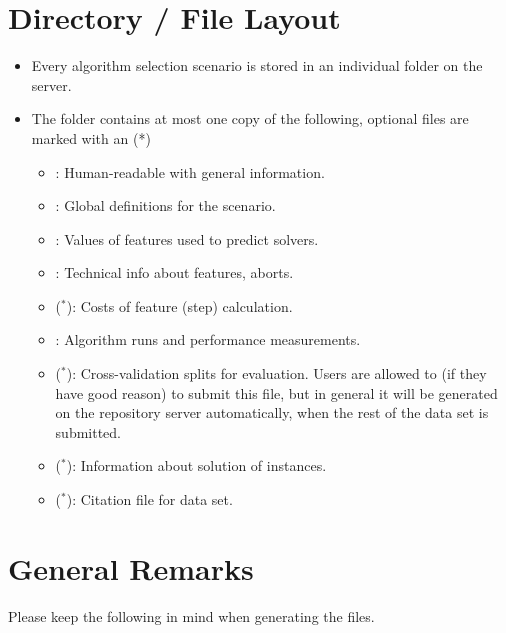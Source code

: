 \documentclass[]{elsarticle}
\begin{document}
\section{Directory / File Layout} 
\begin{itemize}
	\item Every algorithm selection scenario is stored in an individual folder on the server.
	\item The folder contains at most one copy of the following, optional files are marked with an (*)
  	\begin{itemize}
  		\item {}: Human-readable with general information. 
  		\item {}: Global definitions for the scenario. 
  		\item {}: Values of features used to predict solvers. 
  		\item {}: Technical info about features, \eg{} aborts. 
  		\item {} ($^*$): Costs of feature (step) calculation.
  		\item {}: Algorithm runs and performance measurements.
  		\item {} ($^*$): Cross-validation splits for evaluation. Users are allowed
                  to (if they have good reason) to submit this file, but in general it will be generated
                  on the repository server automatically, when the rest of the data set is submitted.
		\item {} ($^*$): Information about solution of instances. 
		\item {} ($^*$): Citation file for data set. 
  	\end{itemize}
\end{itemize}


\section{General Remarks} 

Please keep the following in mind when generating the files.
\end{document}
